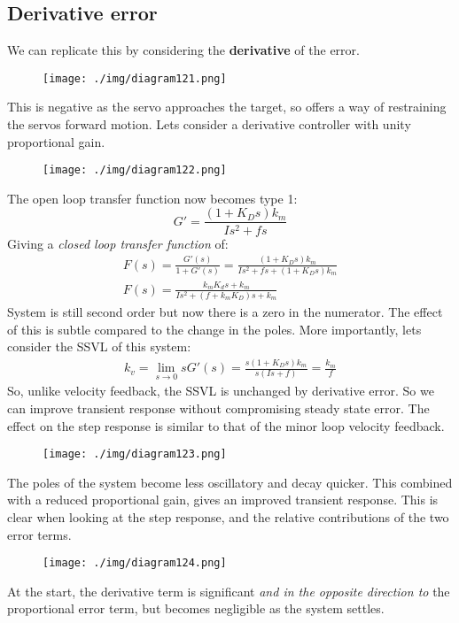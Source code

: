 \subsection{Derivative error}
We can replicate this by considering the \textbf{derivative} of the error.
\begin{figure}[H]
  \centerline{\texttt{[image: ./img/diagram121.png]}}
  \caption{}
\end{figure}
This is negative as the servo approaches the target, so offers a way of restraining the servos forward motion. Lets consider a derivative controller with unity proportional gain.
\begin{figure}[H]
  \centerline{\texttt{[image: ./img/diagram122.png]}}
  \caption{}
\end{figure}
The open loop transfer function now becomes type 1:
\begin{equation}
  G' = \frac{\left( 1 + K_D s \right) k_m}{Is^2 + fs}
\end{equation}
Giving a \textit{closed loop transfer function} of:
\begin{gather}
  F(s) = \frac{G'(s)}{1 + G'(s)} = \frac{\left( 1 + K_D s \right)k_m}{Is^2 + fs + \left( 1+K_D s\right)k_m}\\
  F(s) = \frac{k_m K_d s + k_m}{Is^2 + \left( f + k_m K_D\right)s + k_m}
\end{gather}
System is still second order but now there is a zero in the numerator. The effect of this is subtle compared to the change in the poles. More importantly, lets consider the SSVL of this system:
\begin{align}
  k_v = \lim_{s\rightarrow 0} s G'(s) = \frac{s \left( 1+K_D s\right) k_m}{s\left( Is + f \right)} = \frac{k_m}{f}
\end{align}
So, unlike velocity feedback, the SSVL is unchanged by derivative error. So we can improve transient response without compromising steady state error. The effect on the step response is similar to that of the minor loop velocity feedback.
\begin{figure}[H]
  \centerline{\texttt{[image: ./img/diagram123.png]}}
  \caption{}
\end{figure}
The poles of the system become less oscillatory and decay quicker. This combined with a reduced proportional gain, gives an improved transient response. This is clear when looking at the step response, and the relative contributions of the two error terms.
\begin{figure}[H]
  \centerline{\texttt{[image: ./img/diagram124.png]}}
  \caption{}
\end{figure}
At the start, the derivative term is significant \textit{and in the opposite direction to} the proportional error term, but becomes negligible as the system settles.
